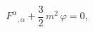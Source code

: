 \begin{equation}
F^{\alpha }{}_{,\alpha }+ \frac{3}{2}\,m^{2}\,\varphi =0,
  \label{mc12}
\end{equation}

